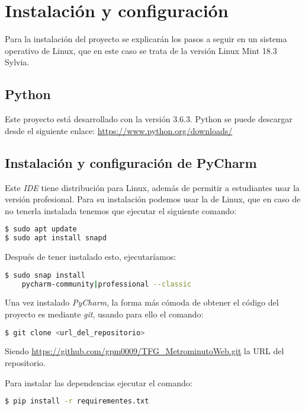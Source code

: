 \section{Instalación y configuración}
Para la instalación del proyecto se explicarán los pasos a seguir en un sistema operativo de Linux, que en este caso se trata de la versión Linux Mint 18.3 Sylvia.

\subsection{Python}

Este proyecto está desarrollado con la versión 3.6.3. Python se puede descargar desde el siguiente enlace: 
\url{https://www.python.org/downloads/}

\subsection{Instalación y configuración de PyCharm}
Este \textit{IDE} tiene distribución para Linux, además de permitir a estudiantes usar la versión profesional. Para su instalación podemos usar la \cite{snap store} de Linux, que en caso de no tenerla instalada tenemos que ejecutar el siguiente comando:

\begin{lstlisting}[language=bash,caption={Instalar snapd}]
$ sudo apt update
$ sudo apt install snapd
\end{lstlisting}
Después de tener instalado esto, ejecutaríamos:
\begin{lstlisting}[language=bash,caption={Instalar PyCharm}]
$ sudo snap install 
	pycharm-community|professional --classic
\end{lstlisting}

Una vez instalado \textit{PyCharm}, la forma más cómoda de obtener el código del proyecto es mediante \textit{git}, usando para ello el comando:
\begin{lstlisting}[language=bash,caption={Descargar el repositorio}]
$ git clone <url_del_repositorio>
\end{lstlisting}
Siendo \url{https://github.com/gpm0009/TFG_MetrominutoWeb.git} la URL del 
repositorio.

Para instalar las dependencias ejecutar el comando:
\begin{lstlisting}[language=bash,caption={Instalar requirements.txt}]
$ pip install -r requirementes.txt
\end{lstlisting}

